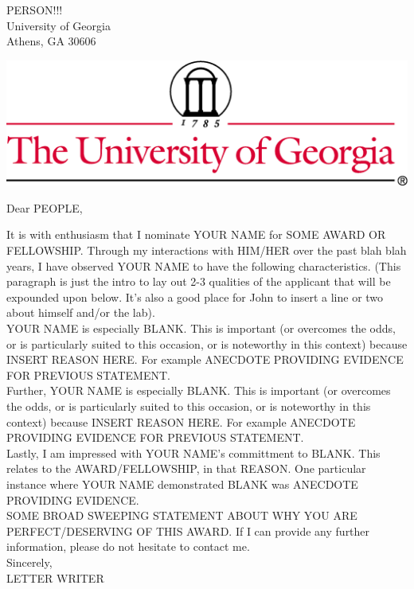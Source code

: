 \documentclass{letter}
\begin{document}
 
\begin{letter}{PERSON!!! \\ University of Georgia \\  Athens, GA 30606} %

\vspace{-2in}
\includegraphics[width=\textwidth]{thin4c.png}


\opening{Dear PEOPLE, }

It is with enthusiasm that I nominate YOUR NAME for SOME AWARD OR FELLOWSHIP. Through my interactions with HIM/HER over the past blah blah years, I have observed YOUR NAME to have the following characteristics. (This paragraph is just the intro to lay out 2-3 qualities of the applicant that will be expounded upon below. It's also a good place for John to insert a line or two about himself and/or the lab). \\

YOUR NAME is especially BLANK. This is important (or overcomes the odds, or is particularly suited to this occasion, or is noteworthy in this context) because INSERT REASON HERE. For example ANECDOTE PROVIDING EVIDENCE FOR PREVIOUS STATEMENT. \\

Further, YOUR NAME is especially BLANK. This is important (or overcomes the odds, or is particularly suited to this occasion, or is noteworthy in this context) because INSERT REASON HERE. For example ANECDOTE PROVIDING EVIDENCE FOR PREVIOUS STATEMENT. \\

Lastly, I am impressed with YOUR NAME's committment to BLANK. This relates to the AWARD/FELLOWSHIP, in that REASON. One particular instance where YOUR NAME demonstrated BLANK was ANECDOTE PROVIDING EVIDENCE. \\

SOME BROAD SWEEPING STATEMENT ABOUT WHY YOU ARE PERFECT/DESERVING OF THIS AWARD. If I can provide any further information, please do not hesitate to contact me. \\

Sincerely,\\

LETTER WRITER




\end{letter}
\end{document}
